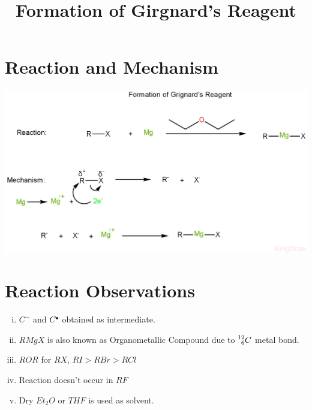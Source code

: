 \documentclass{article}
\title{Formation of Girgnard's Reagent}
\author{}
\date{}
\newcommand*\fullcirc[1][0.3ex]{\tikz\fill (0,0) circle (#1);}
\begin{document}
\maketitle

\section{Reaction and Mechanism}
\begin{center}
    \includegraphics[scale=0.25]{FormationofGrignard'sReagent_1722171477216.JPEG}
\end{center}
\section{Reaction Observations}
\begin{enumerate}[i.]
    \item $C^-$ and $C^{\fullcirc}$ obtained as intermediate.
    \item $RMgX$ is also known as Organometallic Compound due to $\prescript{12}{6}{C}$ metal bond.
    \item $ROR$ for $RX$, $RI>RBr>RCl$
    \item Reaction doesn't occur in $RF$
    \item Dry $Et_{2}O$ or $THF$ is used as solvent.
\end{enumerate}
\end{document}

